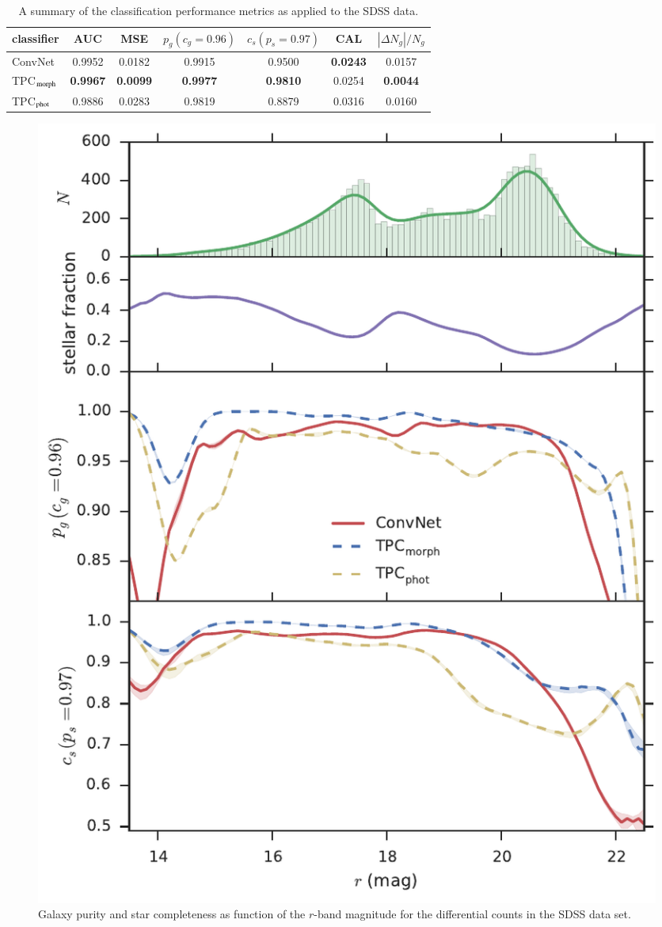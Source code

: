 \documentclass[fleqn,usenatbib]{mnras}
\begin{document}
\begin{table}
  \caption{
    A summary of the classification performance metrics
    as applied to the SDSS data.
  }
  \centering
  \begin{tabular}{l c c c c c c}
    \hline
    classifier & AUC & MSE & $p_{g}(c_g=0.96) $ & $c_{s}(p_s=0.97)$ & CAL & $ |\Delta N_g|/N_g$ \\
    \hline
    ConvNet               & 0.9952          & 0.0182          & 0.9915          & 0.9500          & \textbf{0.0243} & 0.0157          \\
    TPC${}_{{\mathrm{morph}}}$ & \textbf{0.9967} & \textbf{0.0099} & \textbf{0.9977} & \textbf{0.9810} & 0.0254          & \textbf{0.0044} \\
    TPC${}_{{\mathrm{phot}}}$  & 0.9886          & 0.0283          & 0.9819          & 0.8879          & 0.0316          & 0.0160 \\
    \hline
  \end{tabular}
  \label{table:sdss_metrics}
\end{table}


\begin{figure}
  \centering
  \includegraphics[width=\columnwidth]{figures/sdss_mag.pdf}
  \caption{Galaxy purity and star completeness as function of the $r$-band
    magnitude for the differential counts in the SDSS data set.}
  \label{fig:sdss_mag}
\end{figure}
\end{document}
